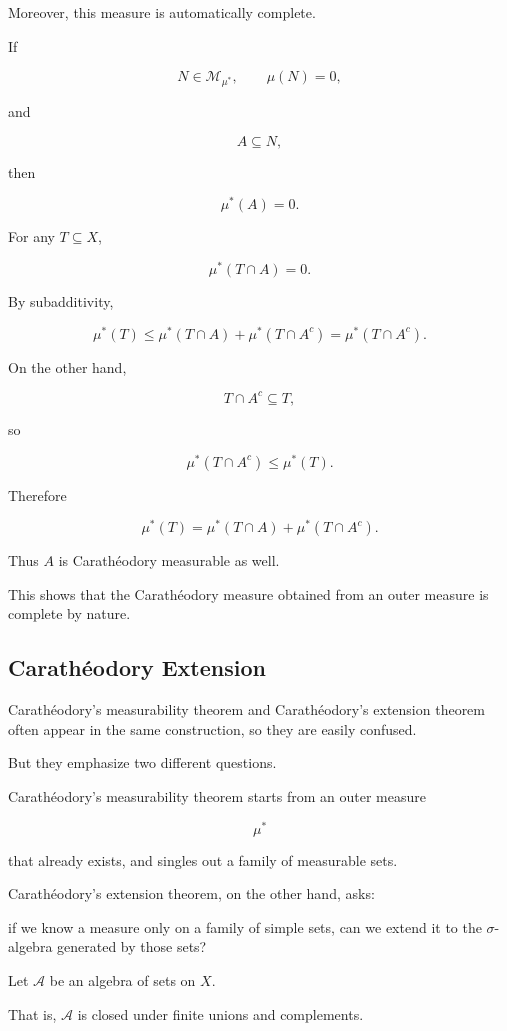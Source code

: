 \documentclass[11pt]{article}
\begin{document}
Moreover, this measure is automatically complete.

If

\[
N\in\mathcal{M}_{\mu^{*}},\qquad\mu(N)=0,
\]

and

\[
A\subseteq N,
\]

then

\[
\mu^{*}(A)=0.
\]

For any $T\subseteq X$,

\[
\mu^{*}(T\cap A)=0.
\]

By subadditivity,

\[
\mu^{*}(T)\leq\mu^{*}(T\cap A)+\mu^{*}(T\cap A^{c})=\mu^{*}(T\cap A^{c}).
\]

On the other hand,

\[
T\cap A^{c}\subseteq T,
\]

so

\[
\mu^{*}(T\cap A^{c})\leq\mu^{*}(T).
\]

Therefore

\[
\mu^{*}(T)=\mu^{*}(T\cap A)+\mu^{*}(T\cap A^{c}).
\]

Thus $A$ is Carathéodory measurable as well.

This shows that the Carathéodory measure obtained from an outer measure is complete by nature.

\subsection{Carathéodory Extension}

Carathéodory's measurability theorem and Carathéodory's extension theorem often appear in the same construction, so they are easily confused.

But they emphasize two different questions.

Carathéodory's measurability theorem starts from an outer measure

\[
\mu^{*}
\]

that already exists, and singles out a family of measurable sets.

Carathéodory's extension theorem, on the other hand, asks:

if we know a measure only on a family of simple sets, can we extend it to the $\sigma$-algebra generated by those sets?

Let $\mathcal{A}$ be an algebra of sets on $X$.

That is, $\mathcal{A}$ is closed under finite unions and complements.
\end{document}
